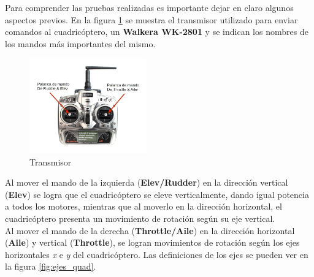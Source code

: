 \documentclass[main]{subfiles}
\begin{document}
Para comprender las pruebas realizadas es importante dejar en claro algunos aspectos previos. En la figura \ref{fig:tx} se muestra el transmisor utilizado para enviar comandos al cuadric\'optero, un \textbf{Walkera WK-2801} y se indican los nombres de los mandos m\'as importantes del mismo.


\begin{figure}
	\vspace{-20pt}
	\begin{center}
	\includegraphics[width=0.45\textwidth]{./pics_sniffer/tx.jpg}
	\end{center}
	\vspace{-25pt}
	\caption{Transmisor}
	\label{fig:tx}
	\vspace{20pt}
\end{figure}

Al mover el mando de la izquierda (\textbf{Elev/Rudder}) en la direcci\'on vertical (\textbf{Elev}) se logra que el cuadric\'optero se eleve verticalmente, dando igual potencia a todos los motores, mientras que al moverlo en la direcci\'on horizontal, el cuadric\'optero presenta un movimiento de rotaci\'on seg\'un su eje vertical.\\

Al mover el mando de la derecha (\textbf{Throttle/Aile}) en la direcci\'on horizontal (\textbf{Aile}) y vertical (\textbf{Throttle}), se logran movimientos de rotaci\'on seg\'un los ejes horizontales \emph{x} e \emph{y} del cuadric\'optero. Las definiciones de los ejes se pueden ver en la figura \ref{fig:ejes_quad}.\\
\end{document}
